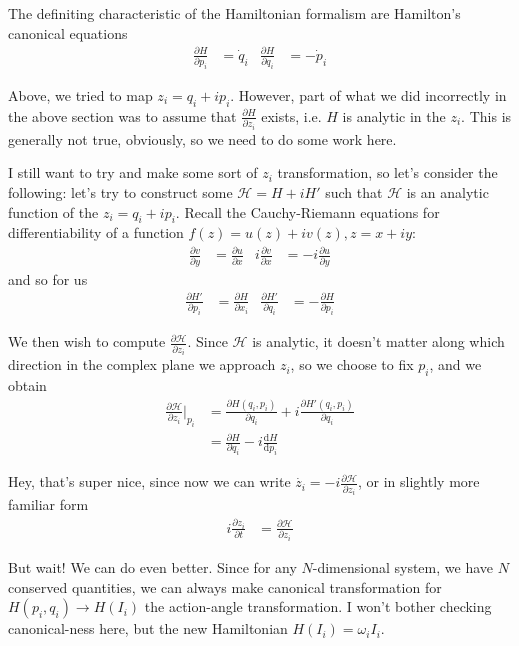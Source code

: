 \documentclass[12pt]{report}
\newcommand*{\rd}[2]{\frac{\mathrm{d}#1}{\mathrm{d}#2}}
\newcommand*{\pd}[2]{\frac{\partial#1}{\partial#2}}
\begin{document}
The definiting characteristic of the Hamiltonian formalism are Hamilton's
canonical equations
\begin{align}
    \pd{H}{p_i} &= \dot{q}_i & \pd{H}{q_i} &= -\dot{p}_i
\end{align}

Above, we tried to map $z_i = q_i + ip_i$. However, part of what we did
incorrectly in the above section was to assume that $\pd{H}{z_i}$ exists, i.e.
$H$ is analytic in the $z_i$. This is generally not true, obviously, so we need
to do some work here.

I still want to try and make some sort of $z_i$ transformation, so let's
consider the following: let's try to construct some $\mathcal{H} = H + iH'$ such
that $\mathcal{H}$ is an analytic function of the $z_i = q_i + ip_i$. Recall the
Cauchy-Riemann equations for differentiability of a function $f(z) = u(z) +
iv(z), z = x + iy$:
\begin{align}
    \pd{v}{y} &= \pd{u}{x}& i\pd{v}{x} &= -i\pd{u}{y}
\end{align}
and so for us
\begin{align}
    \pd{H'}{p_i} &= \pd{H}{x_i}& \pd{H'}{q_i} &= -\pd{H}{p_i}
\end{align}

We then wish to compute $\pd{\mathcal{H}}{z_i}$. Since $\mathcal{H}$ is
analytic, it doesn't matter along which direction in the complex plane we
approach $z_i$, so we choose to fix $p_i$, and we obtain
\begin{align}
    \pd{\mathcal{H}}{z_i}\Bigg|_{p_i} &=
        \pd{H(q_i, p_i)}{q_i} + i\pd{H'(q_i, p_i)}{q_i}\\
        &= \pd{H}{q_i} - i\rd{H}{p_i}
\end{align}

Hey, that's super nice, since now we can write $\dot{z_i} =
-i\pd{\mathcal{H}}{z_i}$, or in slightly more familiar form
\begin{align}
    i\pd{z_i}{t} &= \pd{\mathcal{H}}{z_i}
\end{align}

But wait! We can do even better. Since for any $N$-dimensional system, we have
$N$ conserved quantities, we can always make canonical transformation for
$H(p_i, q_i) \to H(I_i)$ the action-angle transformation. I won't bother
checking canonical-ness here, but the new Hamiltonian $H(I_i) = \omega_iI_i$.
\end{document}
